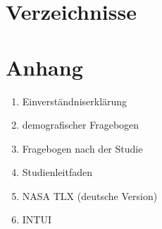 \documentclass[11pt,a4paper,twoside]{book}
\begin{document}
 

\chapter{Verzeichnisse}\label{cha:Verzeichnisse}
\begingroup
\renewcommand{\cleardoublepage}{}
\renewcommand{\clearpage}{}




\endgroup
{}
\listoffigures%

\listoftables%


\fancyhead[LE,RO,LO,RE]{} %
\chapter{Anhang}\label{cha:Anhang}
\begin{enumerate}
	\item Einverständniserklärung
	\item demografischer Fragebogen
	\item Fragebogen nach der Studie
	\item Studienleitfaden
	\item NASA TLX (deutsche Version)
	\item INTUI
\end{enumerate}







\end{document}
